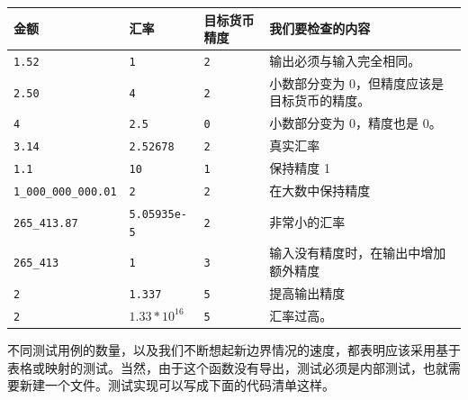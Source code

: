 \begin{center}
\footnotesize
\begin{tabularx}{\textwidth}{|l|l|l|X|}
\hline
金额 & 汇率 & 目标货币精度 & 我们要检查的内容 \\
\hline
\texttt{1.52} & \texttt{1} & \texttt{2} & 输出必须与输入完全相同。 \\
\hline
\texttt{2.50} & \texttt{4} & \texttt{2} & 小数部分变为 0，但精度应该是目标货币的精度。 \\
\hline
\texttt{4} & \texttt{2.5} & \texttt{0} & 小数部分变为 0，精度也是 0。 \\
\hline
\texttt{3.14} & \texttt{2.52678} & \texttt{2} & 真实汇率 \\
\hline
\texttt{1.1} & \texttt{10} & \texttt{1} & 保持精度 1 \\
\hline
\texttt{1\_000\_000\_000.01} & \texttt{2} & \texttt{2} & 在大数中保持精度 \\
\hline
\texttt{265\_413.87} & \texttt{5.05935e-5} & \texttt{2} & 非常小的汇率 \\
\hline
\texttt{265\_413} & \texttt{1} & \texttt{3} & 输入没有精度时，在输出中增加额外精度 \\
\hline
\texttt{2} & \texttt{1.337} & \texttt{5} & 提高输出精度 \\
\hline
\texttt{2} & $1.33 * 10^{16}$ & \texttt{5} & 汇率过高。 \\
\hline
\end{tabularx}
\end{center}

不同测试用例的数量，以及我们不断想起新边界情况的速度，都表明应该采用基于表格或映射的测试。当然，由于这个函数没有导出，测试必须是内部测试，也就需要新建一个文件。测试实现可以写成下面的代码清单这样。

